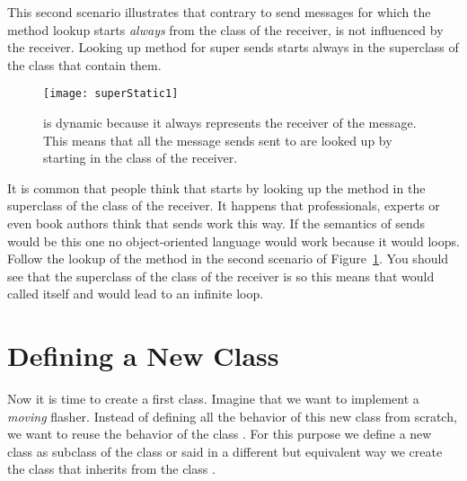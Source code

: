 This second scenario illustrates that contrary to  send messages for which the method lookup starts \emph{always} from the class of the receiver,  is not influenced by the receiver. Looking up method for super sends starts always in the superclass of the class that contain them. 



\begin{figure}
\centerline{\texttt{[image: superStatic1]}} 
\caption{ is dynamic because it always represents the receiver of the message. This means that all the message sends sent to  are looked up by starting in the class of the receiver. \label{fig:superStatic1}}
\end{figure}


\begin{spicy}
It is common that people think that  starts by looking up the method in the superclass of the class of the receiver. It happens that  professionals,  experts or even book authors think that  sends work this way. If the semantics of  sends would be this one no object-oriented language would work because it would loops. Follow the lookup of the method  in the second scenario of Figure~\ref{fig:superStatic1}. You should see that the superclass of the class of the receiver is  so this means that  would called itself and would lead to an infinite loop.
\end{spicy}


\section{Defining a New Class}
Now it is time to create a first class. Imagine that we want to implement a \emph{moving} flasher. Instead of defining all the behavior of this new class from scratch, we want to reuse the behavior of the class . For this purpose we define a new class  as subclass of the class  or said in a different but equivalent way we create the class  that inherits from the class .
 

